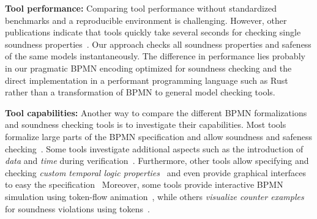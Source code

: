 \documentclass[runningheads]{llncs}
\begin{document}
\textbf{Tool performance:}
Comparing tool performance without standardized benchmarks and a reproducible environment is challenging.
However, other publications indicate that tools quickly take several seconds for checking single soundness properties~\cite{corradiniFormalApproachAnalysis2021,houhouFirstOrderLogicVerification2022,krauterHigherorderTransformationApproach2023}.
Our approach checks all soundness properties and safeness of the same models instantaneously.
The difference in performance lies probably in our pragmatic BPMN encoding optimized for soundness checking and the direct implementation in a performant programming language such as Rust rather than a transformation of BPMN to general model checking tools.

\textbf{Tool capabilities:}
Another way to compare the different BPMN formalizations and soundness checking tools is to investigate their capabilities.
Most tools formalize large parts of the BPMN specification and allow soundness and safeness checking~\cite{corradiniFormalApproachAnalysis2021,houhouFirstOrderLogicVerification2022,krauterFormalizationAnalysisBPMN2023,krauterHigherorderTransformationApproach2023}.
Some tools investigate additional aspects such as the introduction of \textit{data} and \textit{time} during verification~\cite{corradiniFormalisingAnimatingMultiple2022,houhouFirstOrderLogicVerification2022}.
Furthermore, other tools allow specifying and checking \textit{custom temporal logic properties}~\cite{corradiniFormalApproachAnalysis2021,krauterFormalizationAnalysisBPMN2023} and even provide graphical interfaces to easy the specification~\cite{krauterHigherorderTransformationApproach2023}
Moreover, some tools provide interactive BPMN simulation using token-flow animation~\cite{camundaservicesgmbhBpmnjsTokenSimulation2024,corradiniFormalisingAnimatingMultiple2022}, while others \textit{visualize counter examples} for soundness violations using tokens~\cite{houhouFirstOrderLogicVerification2022}.
\end{document}
